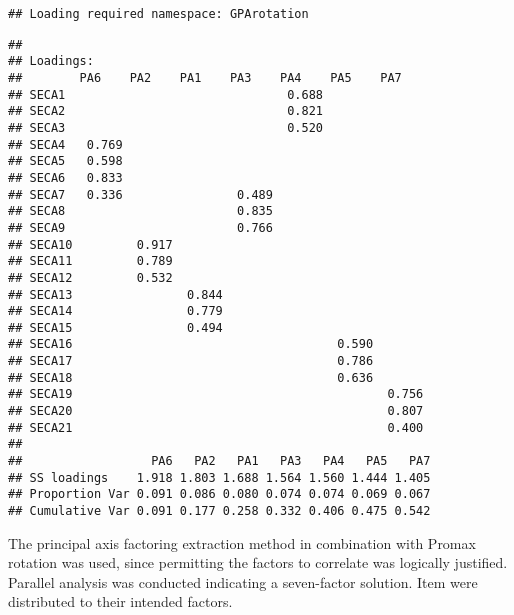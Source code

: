 \documentclass[
]{article}
\newenvironment{Shaded}{\begin{snugshade}}{\end{snugshade}}
\newcommand{\AttributeTok}[1]{\textcolor[rgb]{0.77,0.63,0.00}{#1}}
\newcommand{\FloatTok}[1]{\textcolor[rgb]{0.00,0.00,0.81}{#1}}
\newcommand{\FunctionTok}[1]{\textcolor[rgb]{0.00,0.00,0.00}{#1}}
\newcommand{\NormalTok}[1]{#1}
\newcommand{\SpecialCharTok}[1]{\textcolor[rgb]{0.00,0.00,0.00}{#1}}
\begin{document}
\begin{verbatim}
## Loading required namespace: GPArotation
\end{verbatim}

\begin{Shaded}
\end{Shaded}

\begin{verbatim}
## 
## Loadings:
##        PA6    PA2    PA1    PA3    PA4    PA5    PA7   
## SECA1                               0.688              
## SECA2                               0.821              
## SECA3                               0.520              
## SECA4   0.769                                          
## SECA5   0.598                                          
## SECA6   0.833                                          
## SECA7   0.336                0.489                     
## SECA8                        0.835                     
## SECA9                        0.766                     
## SECA10         0.917                                   
## SECA11         0.789                                   
## SECA12         0.532                                   
## SECA13                0.844                            
## SECA14                0.779                            
## SECA15                0.494                            
## SECA16                                     0.590       
## SECA17                                     0.786       
## SECA18                                     0.636       
## SECA19                                            0.756
## SECA20                                            0.807
## SECA21                                            0.400
## 
##                  PA6   PA2   PA1   PA3   PA4   PA5   PA7
## SS loadings    1.918 1.803 1.688 1.564 1.560 1.444 1.405
## Proportion Var 0.091 0.086 0.080 0.074 0.074 0.069 0.067
## Cumulative Var 0.091 0.177 0.258 0.332 0.406 0.475 0.542
\end{verbatim}

The principal axis factoring extraction method in combination with
Promax rotation was used, since permitting the factors to correlate was
logically justified. Parallel analysis was conducted indicating a
seven-factor solution. Item were distributed to their intended factors.
\end{document}
